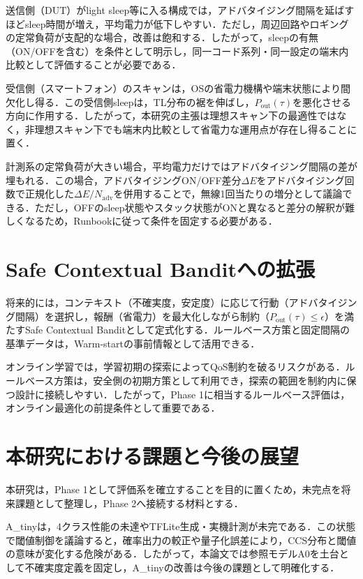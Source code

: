 送信側（DUT）がlight sleep等に入る構成では，アドバタイジング間隔を延ばすほどsleep時間が増え，平均電力が低下しやすい．ただし，周辺回路やロギングの定常負荷が支配的な場合，改善は飽和する．したがって，sleepの有無（ON/OFFを含む）を条件として明示し，同一コード系列・同一設定の端末内比較として評価することが必要である．

受信側（スマートフォン）のスキャンは，OSの省電力機構や端末状態により間欠化し得る．この受信側sleepは，TL分布の裾を伸ばし，$P_{\mathrm{out}}(\tau)$を悪化させる方向に作用する．したがって，本研究の主張は理想スキャン下の最適性ではなく，非理想スキャン下でも端末内比較として省電力な運用点が存在し得ることに置く．

計測系の定常負荷が大きい場合，平均電力だけではアドバタイジング間隔の差が埋もれる．この場合，アドバタイジングON/OFF差分$\Delta E$をアドバタイジング回数で正規化した$\Delta E/N_{\mathrm{adv}}$を併用することで，無線1回当たりの増分として議論できる．ただし，OFFのsleep状態やスタック状態がONと異なると差分の解釈が難しくなるため，Runbookに従って条件を固定する必要がある．

\section{Safe Contextual Banditへの拡張}
将来的には，コンテキスト（不確実度，安定度）に応じて行動（アドバタイジング間隔）を選択し，報酬（省電力）を最大化しながら制約（$P_{\mathrm{out}}(\tau)\le\epsilon$）を満たすSafe Contextual Banditとして定式化する．ルールベース方策と固定間隔の基準データは，Warm-startの事前情報として活用できる．

オンライン学習では，学習初期の探索によってQoS制約を破るリスクがある．ルールベース方策は，安全側の初期方策として利用でき，探索の範囲を制約内に保つ設計に接続しやすい．したがって，Phase 1に相当するルールベース評価は，オンライン最適化の前提条件として重要である．

\section{本研究における課題と今後の展望}
本研究は，Phase 1として評価系を確立することを目的に置くため，未完点を将来課題として整理し，Phase 2へ接続する材料とする．

A\_tinyは，4クラス性能の未達やTFLite生成・実機計測が未完である．この状態で閾値制御を議論すると，確率出力の較正や量子化誤差により，CCS分布と閾値の意味が変化する危険がある．したがって，本論文では参照モデルA0を土台として不確実度定義を固定し，A\_tinyの改善は今後の課題として明確化する．


